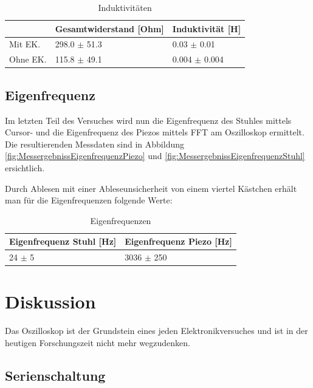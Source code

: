 \documentclass[12pt,a4paper,twoside]{article}
\begin{document}
\begin{table}[H]
    \centering
    \caption{Induktivitäten}
    \label{tab:Induktivitäten}
    \begin{tabular}{| l | l | l |}
        \hline
         & Gesamtwiderstand [Ohm] & Induktivität [H] \\
        \hline
        Mit EK. & 298.0 $\pm$ 51.3 & 0.03 $\pm$ 0.01 \\
        Ohne EK. & 115.8 $\pm$ 49.1 & 0.004 $\pm$  0.004 \\
        \hline
    \end{tabular}
\end{table}


\subsection{Eigenfrequenz}

Im letzten Teil des Versuches wird nun die Eigenfrequenz des Stuhles mittels Cursor- und die Eigenfrequenz des Piezos mittels FFT am Oszilloskop ermittelt. Die resultierenden Messdaten sind in Abbildung \ref{fig:MessergebnissEigenfrequenzPiezo} und \ref{fig:MessergebnissEigenfrequenzStuhl} ersichtlich. \newline

\noindent
Durch Ablesen mit einer Ableseunsicherheit von einem viertel Kästchen erhält man für die Eigenfrequenzen folgende Werte:

\begin{table}[H]
    \centering
    \caption{Eigenfrequenzen}
    \label{tab:Eigenfrequenzen}
    \begin{tabular}{| l | l |}
        \hline
        Eigenfrequenz Stuhl [Hz] & Eigenfrequenz Piezo [Hz] \\
        \hline
        24 $\pm$ 5 & 3036 $\pm$ 250 \\
        \hline
    \end{tabular}
\end{table}


\section{Diskussion} %

Das Oszilloskop ist der Grundstein eines jeden Elektronikversuches und ist in der heutigen Forschungszeit nicht mehr wegzudenken.

\subsection{Serienschaltung}
\end{document}
